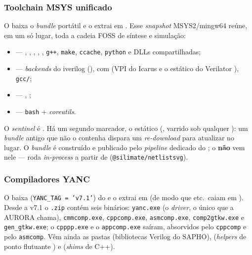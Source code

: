 \subsubsection{Toolchain MSYS unificado}

O  baixa o \emph{bundle} portátil
 e o extrai em . Esse
\emph{snapshot} MSYS2/mingw64 reúne, em um só lugar, toda a cadeia FOSS de
síntese e simulação:

\begin{itemize}[nosep]
  \item {} --- , , ,
        , , \texttt{g++}, \texttt{make},
        \texttt{ccache}, \texttt{python} e DLLs compartilhadas;
  \item {} --- \emph{backends} do iverilog (),
         com  (VPI do Icarus
         e o estático do Verilator
        ), \texttt{gcc/};
  \item {} --- , ;
  \item {} --- \texttt{bash} + \emph{coreutils}.
\end{itemize}

\noindent
O \emph{sentinel} é .
Há um segundo marcador, o  estático
(, varrido sob qualquer
): um \emph{bundle} antigo que não o contenha dispara um
\emph{re-download} para atualizar no lugar. O \emph{bundle} é construído e
publicado pelo \emph{pipeline} dedicado do ; o
 \textbf{não} vem nele --- roda \emph{in-process} a partir de
 (\lstinline|@silimate/netlistsvg|).

\subsubsection{Compiladores YANC}

O  baixa  (\texttt{YANC\_TAG = 'v7.1'})
do  e o extrai em  (de modo que 
etc.\ caiam em ). Desde a v7.1 o \texttt{.zip} contém seis
binários: \texttt{yanc.exe} (o \emph{driver}, o único que a AURORA chama),
\texttt{cmmcomp.exe}, \texttt{cppcomp.exe}, \texttt{asmcomp.exe},
\texttt{comp2gtkw.exe} e \texttt{gen\_gtkw.exe}; o \texttt{cpppp.exe} e o
\texttt{appcomp.exe} saíram, absorvidos pelo \texttt{cppcomp} e pelo
\texttt{asmcomp}. Vêm ainda as
pastas  (bibliotecas Verilog do SAPHO),  (\emph{helpers}
de ponto flutuante ) e  (\emph{shims} de C++).

